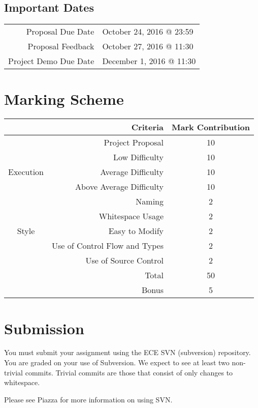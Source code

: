 \documentclass{article}
\begin{document}
\subsection*{Important Dates}
\begin{tabular}{rl}
Proposal Due Date & October 24, 2016 @ 23:59\\
Proposal Feedback & October 27, 2016 @ 11:30\\
Project Demo Due Date & December 1, 2016 @ 11:30
\end{tabular}

\section*{Marking Scheme}
\begin{center}
\begin{tabular}[c]{cr|c}
& \textbf{Criteria} & \textbf{Mark Contribution} \\ \hline

& Project Proposal & 10 \\ \hline

\multirow{3}{*}{Execution}
	& Low Difficulty & 10 \\
	& Average Difficulty & 10 \\
	& Above Average Difficulty & 10 \\ \hline

\multirow{5}{*}{Style} 
	& Naming & 2 \\
    & Whitespace Usage & 2 \\
	& Easy to Modify & 2 \\
	& Use of Control Flow and Types & 2 \\
	& Use of Source Control & 2 \\ \hhline{==|=}
	
& Total & 50 \\ \hhline{==|=}
& Bonus & 5
\end{tabular}
\end{center}

\section*{Submission}
You must submit your assignment using the ECE SVN (subversion) repository.  You are graded on your use of Subversion.  We expect to see at least two non-trivial commits. Trivial commits are those that consist of only changes to whitespace.

Please see Piazza for more information on using SVN.
\end{document}

